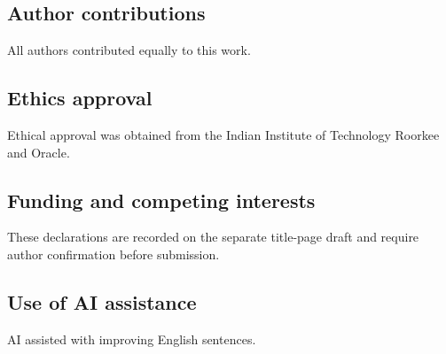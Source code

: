 \documentclass[pdflatex,sn-basic]{sn-jnl}
\begin{document}
\subsection*{Author contributions}
All authors contributed equally to this work.
\subsection*{Ethics approval}
Ethical approval was obtained from the Indian Institute of Technology Roorkee and Oracle.
\subsection*{Funding and competing interests}
These declarations are recorded on the separate title-page draft and require author confirmation before submission.
\subsection*{Use of AI assistance}
AI assisted with improving English sentences. 
\nocite{R94}

\end{document}
